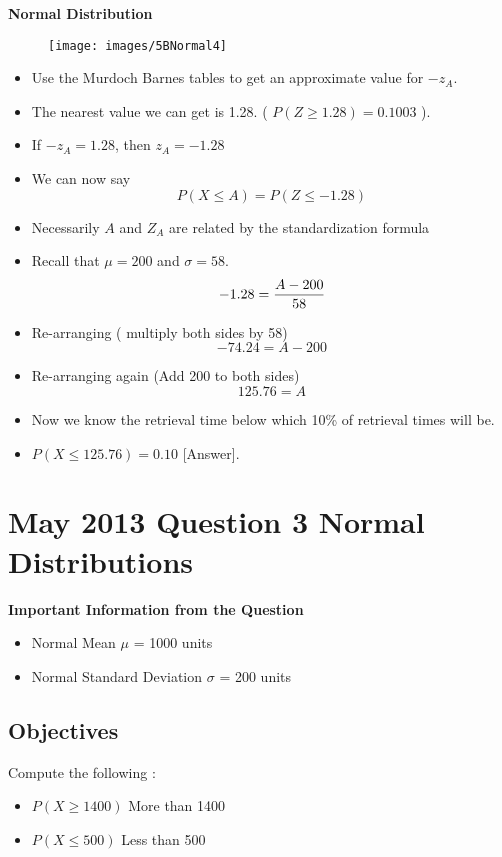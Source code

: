 \documentclass[]{report}
\begin{document}
\noindent \textbf{Normal Distribution}
\begin{figure}
	\centering
	\texttt{[image: images/5BNormal4]}
	\caption{}
	\label{fig:5BNormal4}
\end{figure}


\begin{itemize}
		\item Use the Murdoch Barnes tables to get an approximate value for $-z_A$.
		\item The nearest value we can get is 1.28. ( $P( Z \geq 1.28) = 0.1003$ ).
		\item If $-z_A = 1.28$, then $z_A=-1.28$
		\item We can now say
		\[ P(X \leq A) = P(Z \leq -1.28) \]
		
		\item Necessarily $A$ and $Z_A$ are related by the standardization formula
		\item Recall that $\mu = 200$ and $\sigma = 58$.
		\[ -1.28  = {A - 200 \over 58} \]
		\item Re-arranging ( multiply both sides by 58)
		\[ -74.24  = A - 200 \]
		\item Re-arranging again (Add 200 to both sides)
		\[ 125.76 =  A \]

		\item Now we know the retrieval time below which 10\% of retrieval times will be.
		\item $P(X \leq 125.76) = 0.10$ [Answer].
	\end{itemize}




\section*{May 2013 Question 3 Normal Distributions}

\noindent \textbf{Important Information from the Question}
\begin{itemize}
	\item Normal Mean $\mu$ = 1000 units
	\item Normal Standard Deviation $\sigma$ = 200 units 
\end{itemize}

\subsection*{Objectives}
Compute the following : 
\begin{itemize}
	\item $P(X \geq 1400 )$ More than 1400
	\item $P(X \leq 500)$ Less than 500
\end{itemize}
\end{document}
